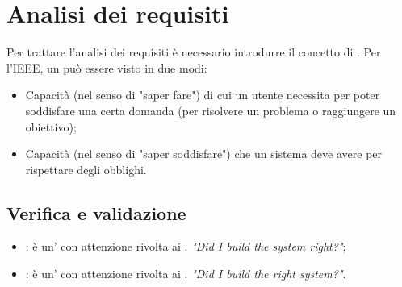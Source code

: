 \documentclass[../main]{subfiles}
\begin{document}
\section{Analisi dei requisiti}
Per trattare l'analisi dei requisiti è necessario introdurre il concetto di . Per l'IEEE, un  può essere visto in due modi:
\begin{itemize}
    \item Capacità (nel senso di "saper fare") di cui un utente necessita per poter soddisfare una certa domanda (per risolvere un problema o raggiungere un obiettivo);
    \item Capacità (nel senso di "saper soddisfare") che un sistema deve avere per rispettare degli obblighi.
\end{itemize}
\subsection{Verifica e validazione}
\begin{itemize}
    \item {}: è un' con attenzione rivolta ai . \textit{"Did I build the system right?"};
    \item {}: è un' con attenzione rivolta ai . \textit{"Did I build the right system?"}.
\end{itemize}
\end{document}
